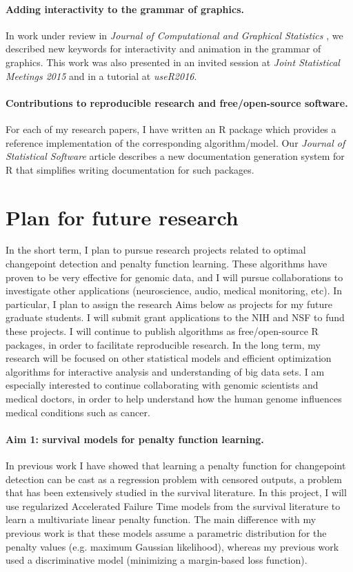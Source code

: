 \documentclass{article}
\begin{document}
\paragraph{Adding interactivity to the grammar of graphics.} In work
under review in \emph{Journal of Computational and Graphical
  Statistics} \citep{animint}, we described new keywords for
interactivity and animation in the grammar of graphics. This work was
also presented in an invited session at \emph{Joint Statistical
  Meetings 2015} and in a tutorial at \emph{useR2016}.

\paragraph{Contributions to reproducible research and free/open-source
  software.} For each of my research papers, I have written an R
package which provides a reference implementation of the corresponding
algorithm/model. Our \emph{Journal of Statistical Software} article
\citep{hocking13:inlinedocs} describes a new documentation generation
system for R that simplifies writing documentation for such packages.

\section{Plan for future research}

In the short term, I plan to pursue research projects related to
optimal changepoint detection and penalty function learning. These
algorithms have proven to be very effective for genomic data, and I
will pursue collaborations to investigate other applications
(neuroscience, audio, medical monitoring, etc). In particular, I plan
to assign the research Aims below as projects for my future graduate
students. I will submit grant applications to the NIH and NSF to fund
these projects. I will continue to publish algorithms as
free/open-source R packages, in order to facilitate reproducible
research. In the long term, my research will be focused on other
statistical models and efficient optimization algorithms for
interactive analysis and understanding of big data sets. I am
especially interested to continue collaborating with genomic
scientists and medical doctors, in order to help understand how the human
genome influences medical conditions such as cancer.


\paragraph{Aim 1: survival models for penalty function learning.} In
previous work I have showed that learning a penalty function for
changepoint detection can be cast as a regression problem with
censored outputs, a problem that has been extensively studied in the
survival literature. In this project, I will use regularized Accelerated Failure
Time models from the survival literature to learn a multivariate
linear penalty function. The main difference with my previous work is
that these models assume a parametric distribution for the penalty values
(e.g. maximum Gaussian likelihood), whereas my previous
work used a discriminative model (minimizing a margin-based loss
function).
\end{document}
